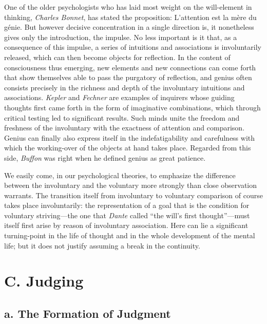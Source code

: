 \documentclass[12pt,a4paper]{book}
\newcommand{\opage}[1]{\marginnote{\footnotesize\textit{[#1]}}}
\begin{document}
One of the older psychologists who has laid most weight on the
will-element in thinking, \emph{Charles Bonnet}, has \opage{70}stated the
proposition: L'attention est la mère du génie. But however decisive
concentration in a single direction is, it nonetheless gives only the
introduction, the impulse. No less important is it that, as a consequence
of this impulse, a series of intuitions and associations is involuntarily
released, which can then become objects for reflection. In the content of
consciousness thus emerging, new elements and new connections can come
forth that show themselves able to pass the purgatory of reflection, and
genius often consists precisely in the richness and depth of the
involuntary intuitions and associations. \emph{Kepler} and \emph{Fechner}
are examples of inquirers whose guiding thoughts first came forth in the
form of imaginative combinations, which through critical testing led to
significant results. Such minds unite the freedom and freshness of the
involuntary with the exactness of attention and comparison. Genius can
finally also express itself in the indefatigability and carefulness with
which the working-over of the objects at hand takes place. Regarded from
this side, \emph{Buffon} was right when he defined genius as great
patience.

We easily come, in our psychological theories, to emphasize the difference
between the involuntary and the voluntary more strongly than close
observation warrants. The transition itself from involuntary to voluntary
comparison of course takes place involuntarily: the representation of a
goal that is the condition for voluntary striving---the one that
\emph{Dante} called ``the will's first thought''---must itself first arise
by reason of involuntary association. Here can lie a significant
turning-point in the life of thought and in the whole development of the
mental life; but it does not justify assuming a break in the continuity.

\section*{C. Judging}
\label{sec:dommen}

\subsection*{a. The Formation of Judgment}
\label{ssec:domsdannelse}
\end{document}
